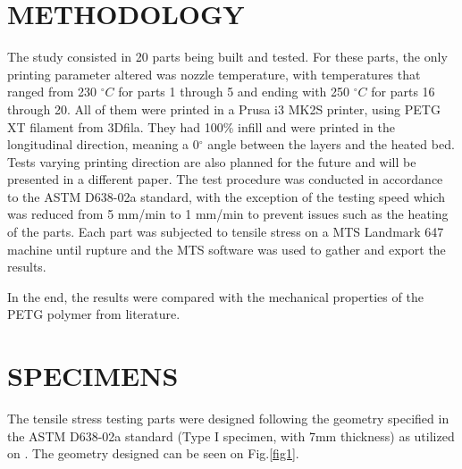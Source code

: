 \documentclass[10pt,fleqn,a4paper,twoside]{article}
\begin{document}
\section{METHODOLOGY}

The study consisted in 20 parts being built and tested. For these parts, the only printing parameter altered was nozzle temperature, with temperatures that ranged from 230 $^\circ C$ for parts 1 through 5 and ending with 250 $^\circ C$ for parts 16 through 20. All of them were printed in a Prusa i3 MK2S printer, using PETG XT filament from 3Dfila. They had 100\% infill and were printed in the longitudinal direction, meaning a 0$^\circ$ angle between the layers and the heated bed. Tests varying printing direction are also planned for the future and will be presented in a different paper. 
The test procedure was conducted in accordance to the ASTM D638-02a standard, with the exception of the testing speed which was reduced from 5 mm/min to 1 mm/min to prevent issues such as the heating of the parts.
Each part was subjected to tensile stress on a MTS Landmark 647 machine until rupture and the MTS software was used to gather and export the results. 

In the end, the results were compared with the mechanical properties of the PETG polymer from literature. 



\section{SPECIMENS}

The tensile stress testing parts were designed following the geometry specified in the ASTM D638-02a standard (Type I specimen, with 7mm thickness) as utilized on \citep{test_on_fdm}. The geometry designed can be seen on Fig.\ref{fig1}.
\end{document}
